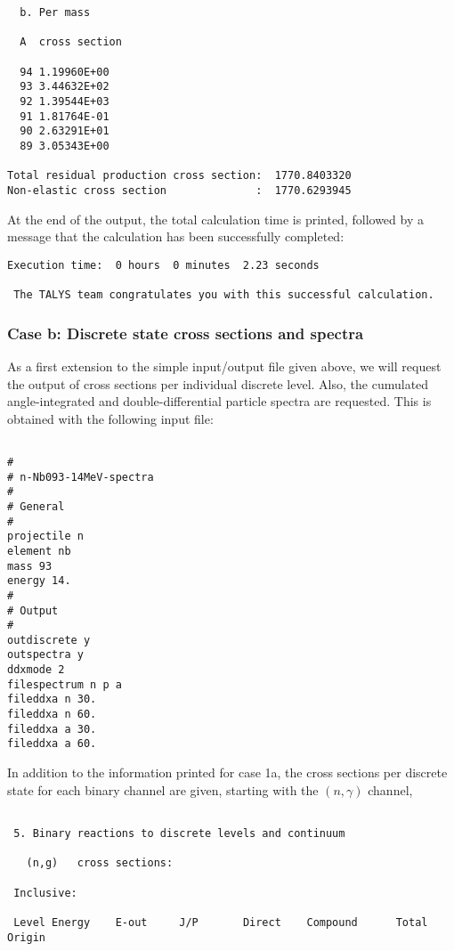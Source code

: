 \begin{samplecase}
{\begin{verbatim}
  b. Per mass

  A  cross section

  94 1.19960E+00
  93 3.44632E+02
  92 1.39544E+03
  91 1.81764E-01
  90 2.63291E+01
  89 3.05343E+00

Total residual production cross section:  1770.8403320
Non-elastic cross section              :  1770.6293945
\end{verbatim} } \renewcommand{\baselinestretch}{1.07}\small\normalsize
\noindent
At the end of the output, the total calculation time is printed, followed by a 
message that the calculation has been successfully completed:

{\small \begin{verbatim}
Execution time:  0 hours  0 minutes  2.23 seconds 

 The TALYS team congratulates you with this successful calculation.
\end{verbatim} } \renewcommand{\baselinestretch}{1.07}\small\normalsize
\subsubsection{Case b: Discrete state cross sections and spectra}
As a first extension to the simple input/output file given above, we will 
request the 
output of cross sections per individual discrete level.
Also, the cumulated angle-integrated and double-differential 
particle spectra are requested. This is obtained with the following input file:

{\small \begin{verbatim}

#
# n-Nb093-14MeV-spectra
#
# General
#
projectile n
element nb
mass 93
energy 14.
#
# Output
#
outdiscrete y 
outspectra y 
ddxmode 2 
filespectrum n p a 
fileddxa n 30. 
fileddxa n 60. 
fileddxa a 30. 
fileddxa a 60.
\end{verbatim} } \renewcommand{\baselinestretch}{1.07}\small\normalsize
\noindent
In addition to the information printed for case 1a, the cross 
sections per discrete state for each binary channel are given, starting with the
$(n,\gamma )$ channel,

{\small \begin{verbatim}

 5. Binary reactions to discrete levels and continuum

   (n,g)   cross sections:

 Inclusive:

 Level Energy    E-out     J/P       Direct    Compound      Total     Origin


\end{verbatim}}
\end{samplecase}
